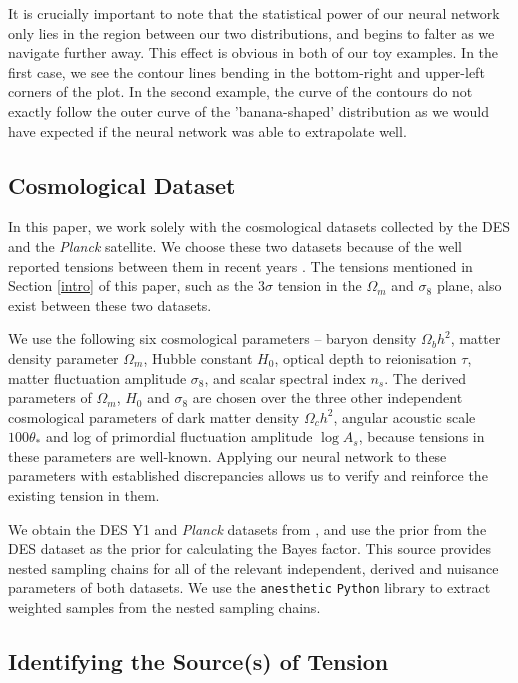 \documentclass[%
 reprint,
 amsmath,amssymb,
 aps,
]{revtex4-2}
\begin{document}
It is crucially important to note that the statistical power of our neural network only lies in the region between our two distributions, and begins to falter as we navigate further away. This effect is obvious in both of our toy examples. In the first case, we see the contour lines bending in the bottom-right and upper-left corners of the plot. In the second example, the curve of the contours do not exactly follow the outer curve of the 'banana-shaped' distribution as we would have expected if the neural network was able to extrapolate well.


\subsection{Cosmological Dataset}

In this paper, we work solely with the cosmological datasets collected by the DES and the \textit{Planck} satellite. We choose these two datasets because of the well reported tensions between them in recent years \cite{Handley2019, Lemos2020}. The tensions mentioned in Section \ref{intro} of this paper, such as the $3\sigma$ tension in the $\Omega_m$ and $\sigma_8$ plane, also exist between these two datasets.

We use the following six cosmological parameters -- baryon density $\Omega_b h^2$, matter density parameter $\Omega_m$, Hubble constant $H_0$, optical depth to reionisation $\tau$, matter fluctuation amplitude $\sigma_8$, and scalar spectral index $n_s$. The derived parameters of $\Omega_m$, $H_0$ and $\sigma_8$ are chosen over the three other independent cosmological parameters of dark matter density $\Omega_c h^2$, angular acoustic scale $100 \theta_*$ and log of primordial fluctuation amplitude $\log A_s$,  because tensions in these parameters are well-known. Applying our neural network to these parameters with established discrepancies allows us to verify and reinforce the existing tension in them.

We obtain the DES Y1 and \textit{Planck} datasets from \cite{Dataset}, and use the prior from the DES dataset as the prior for calculating the Bayes factor. This source provides nested sampling chains for all of the relevant independent, derived and nuisance parameters of both datasets. We use the \texttt{anesthetic} \texttt{Python} library \cite{anesthetic} to extract weighted samples from the nested sampling chains. 


\subsection{Identifying the Source(s) of Tension} \label{section:source}
\end{document}
